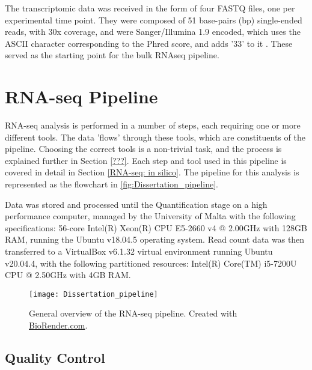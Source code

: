 The transcriptomic data was received in the form of four FASTQ \citep{cock2010sanger} files, one per experimental time point. They were composed of 51 base-pairs (bp) single-ended reads, with 30x coverage, and were Sanger/Illumina 1.9 encoded, which uses the ASCII character corresponding to the Phred score, and adds '33' to it \citep{ewing1998base}. These served as the starting point for the bulk RNAseq pipeline.

\section{RNA-seq Pipeline}%
RNA-seq analysis is performed in a number of steps, each requiring one or more different tools. The data 'flows' through these tools, which are constituents of the pipeline. Choosing the correct tools is a non-trivial task, and the process is explained further in Section \ref{???}. Each step and tool used in this pipeline is covered in detail in Section \ref{RNA-seq: in silico}. The pipeline for this analysis is represented as the flowchart in \autoref{fig:Dissertation_pipeline}.

Data was stored and processed until the Quantification stage on a high performance computer, managed by the University of Malta with the following specifications: 56-core Intel(R) Xeon(R) CPU E5-2660 v4 @ 2.00GHz with 128GB RAM, running the Ubuntu v18.04.5 operating system. Read count data was then transferred to a VirtualBox v6.1.32 \citep{virtualbox} virtual environment running Ubuntu v20.04.4, with the following partitioned resources: Intel(R) Core(TM) i5-7200U CPU @ 2.50GHz with 4GB RAM.
\begin{figure}[!ht]
    \centering
    \texttt{[image: Dissertation\_pipeline]}
    \caption[General overview of the RNA-seq pipeline.]{General overview of the RNA-seq pipeline. Created with \href{https://biorender.com/}{BioRender.com}.} 
    \label{fig:Dissertation_pipeline}
\end{figure}

\clearpage
\subsection{Quality Control}%

